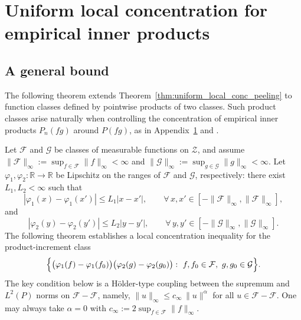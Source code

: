 \documentclass[11pt]{article}
\theoremstyle{plain}
\theoremstyle{definition} %
\begin{document}
\section{Uniform local concentration for empirical inner products}

\label{appendix:innerproduct}


\subsection{A general bound}

\label{appendix:innerproduct::gen}


The following theorem extends Theorem~\ref{thm:uniform_local_conc_peeling} to
function classes defined by pointwise products of two classes. Such product
classes arise naturally when controlling the concentration of empirical inner
products $P_n(fg)$ around $P(fg)$, as in Appendix~\ref{appendix:innerproduct}
and \citet{van2014uniform}. 


Let $\mathcal F$ and $\mathcal G$ be classes of measurable functions on $\mathcal Z$, and assume
$\|\mathcal F\|_\infty:=\sup_{f\in\mathcal F}\|f\|_\infty<\infty$ and
$\|\mathcal G\|_\infty:=\sup_{g\in\mathcal G}\|g\|_\infty<\infty$.
Let $\varphi_1,\varphi_2:\mathbb R\to\mathbb R$ be Lipschitz on the ranges of $\mathcal F$ and $\mathcal G$, respectively: there exist
$L_1,L_2<\infty$ such that
\[
|\varphi_1(x)-\varphi_1(x')|\le L_1|x-x'|,
\qquad \forall\,x,x'\in[-\|\mathcal F\|_\infty,\|\mathcal F\|_\infty],
\]
and
\[
|\varphi_2(y)-\varphi_2(y')|\le L_2|y-y'|,
\qquad \forall\,y,y'\in[-\|\mathcal G\|_\infty,\|\mathcal G\|_\infty].
\]
The following theorem establishes a local concentration inequality for the product-increment class
\[
\Bigl\{
\bigl(\varphi_1(f)-\varphi_1(f_0)\bigr)\bigl(\varphi_2(g)-\varphi_2(g_0)\bigr)
:\ f,f_0\in\mathcal F,\ g,g_0\in\mathcal G
\Bigr\}.
\]
The key condition below is a H\"older-type coupling between the supremum and $L^2(P)$ norms on $\mathcal F-\mathcal F$, namely,
$\|u\|_\infty \le c_{\infty}\,\|u\|^\alpha$ for all $u\in\mathcal F-\mathcal F$. One may always take $\alpha=0$ with
$c_{\infty}:=2\sup_{f\in\mathcal F}\|f\|_\infty$.
\end{document}
